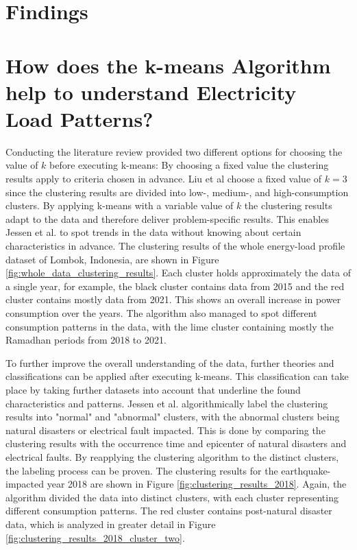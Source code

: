 \section{Findings}
\label{cha:findings}


\section{How does the k-means Algorithm help to understand Electricity Load Patterns?}
\label{sec:findings_understand_electricity_load_patterns}
Conducting the literature review provided two different options for choosing the value of $k$ before executing k-means:
By choosing a fixed value the clustering results apply to criteria chosen in advance.
Liu et al \cite{LIU-BDE} choose a fixed value of $k=3$ since the clustering results are divided into low-, medium-, and high-consumption clusters.
By applying k-means with a variable value of $k$ the clustering results adapt to the data and therefore deliver problem-specific results.
This enables Jessen et al. \cite{JES-IND} to spot trends in the data without knowing about certain characteristics in advance.
The clustering results of the whole energy-load profile dataset of Lombok, Indonesia, are shown in Figure \ref{fig:whole_data_clustering_results}.
Each cluster holds approximately the data of a single year, for example, the black cluster contains data from 2015 and the red cluster contains mostly data from 2021.
This shows an overall increase in power consumption over the years.
The algorithm also managed to spot different consumption patterns in the data, with the lime cluster containing mostly the Ramadhan periods from 2018 to 2021.

To further improve the overall understanding of the data, further theories and classifications can be applied after executing k-means.
This classification can take place by taking further datasets into account that underline the found characteristics and patterns.
Jessen et al. \cite{JES-IND} algorithmically label the clustering results into "normal" and "abnormal" clusters, with the abnormal clusters being natural disasters or electrical fault impacted.
This is done by comparing the clustering results with the occurrence time and epicenter of natural disasters and electrical faults.
By reapplying the clustering algorithm to the distinct clusters, the labeling process can be proven.
The clustering results for the earthquake-impacted year 2018 are shown in Figure \ref{fig:clustering_results_2018}.
Again, the algorithm divided the data into distinct clusters, with each cluster representing different consumption patterns.
The red cluster contains post-natural disaster data, which is analyzed in greater detail in Figure \ref{fig:clustering_results_2018_cluster_two}.

